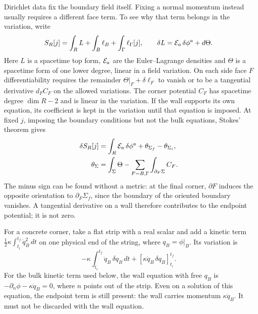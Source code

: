 Dirichlet data fix the boundary field itself. Fixing a normal momentum
instead usually requires a different face term. To see why that term belongs
in the variation, write
\[
 S_R[j]=\int_R L+\int_B\ell_B+\int_\Gamma\ell_\Gamma[j],
 \qquad \delta L={\cal E}_a\,\delta\phi^a+d\Theta.
\]
Here $L$ is a spacetime top form, ${\cal E}_a$ are the Euler--Lagrange
densities and $\Theta$ is a spacetime form of one lower degree, linear in a
field variation. On each side face $F$ differentiability requires the
remainder $\Theta|_F+\delta\ell_F$ to vanish or to be a tangential derivative
$d_F C_F$ on the allowed variations. The corner potential $C_F$ has
spacetime degree $\dim R-2$ and is linear in the variation. If the wall
supports its own equation,
its coefficient is kept in the variation until that equation is imposed.
At fixed $j$, imposing the boundary conditions but not the bulk equations,
Stokes' theorem gives
\begin{align}
 \delta S_R[j]&=\int_R {\cal E}_a\,\delta\phi^a
              +\theta_{\Sigma_f}-\theta_{\Sigma_i},\nonumber\\
 \theta_\Sigma&=\int_\Sigma\Theta
         -\sum_{F=B,\Gamma}\int_{\partial_F\Sigma} C_F.
 \label{eq:04-endpoint}
\end{align}
The minus sign can be found without a metric: at the final corner,
$\partial F$ induces the opposite orientation to $\partial_F\Sigma_f$,
since the boundary of the oriented boundary vanishes. A tangential derivative
on a wall therefore contributes to the endpoint potential; it is not zero.

For a concrete corner, take a flat strip with a real scalar and add a kinetic
term $\tfrac12\kappa\int_{t_i}^{t_f}\dot q_B^2\,dt$ on one physical end of
the string, where $q_B=\phi|_B$. Its variation is
\[
 -\kappa\int_{t_i}^{t_f}\ddot q_B\,\delta q_B\,dt
      +[\kappa\dot q_B\,\delta q_B]_{t_i}^{t_f}.
\]
For the bulk kinetic term used below, the wall equation with free $q_B$ is
$-\partial_n\phi-\kappa\ddot q_B=0$, where $n$ points out of the strip.
Even on a solution of this equation, the endpoint term is still present: the
wall carries momentum $\kappa\dot q_B$. It must not be discarded with the
wall equation.

